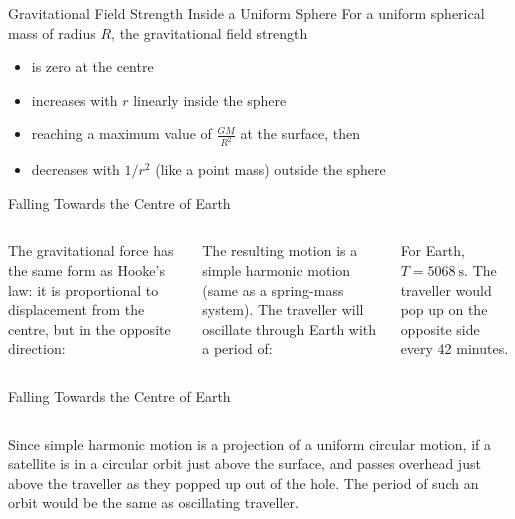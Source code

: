 \documentclass[12pt,compress,aspectratio=169]{beamer}
\begin{document}
\begin{frame}{Gravitational Field Strength Inside a Uniform Sphere}
  For a uniform spherical mass of radius $R$, the gravitational field strength
  \begin{itemize}
  \item is zero at the centre
  \item increases with $r$ linearly inside the sphere
  \item reaching a maximum value of $\frac{GM}{R^2}$ at the surface, then
  \item decreases with $1/r^2$ (like a point mass) outside the sphere
  \end{itemize}
  \begin{center}
  \end{center}
\end{frame}



\begin{frame}{Falling Towards the Centre of Earth}
  \begin{columns}

    The gravitational force has the same form as Hooke's law: it is
    proportional to displacement from the centre, but in the opposite
    direction:

    
    \vspace{-.15in}The resulting motion is a simple harmonic motion (same as a
    spring-mass system). The traveller will oscillate through Earth with a
    period of:


    For Earth, $T=\SI{5068}\second$. The traveller would pop up on the opposite
    side every 42 minutes.
  \end{columns}
\end{frame}




\begin{frame}{Falling Towards the Centre of Earth}
  \begin{columns}

    Since simple harmonic motion is a projection of a uniform circular motion,
    if a satellite is in a circular orbit just above the surface, and passes
    overhead just above the traveller as they popped up out of the hole. The
    period of such an orbit would be the same as oscillating traveller.
  \end{columns}
\end{frame}
\end{document}
